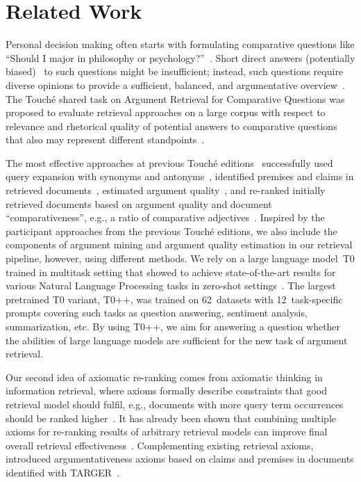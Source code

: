 \section{Related Work}

Personal decision making often starts with formulating comparative questions like ``Should I major in philosophy or psychology?''~\cite{BondarenkoFBGAPBSWPH2020,BondarenkoGFBAPBSWPH2021,BondarenkoFKSGBPBSWPH2022}. Short direct answers (potentially biased)~\cite{PotthastHS2020} to such questions might be insufficient; instead, such questions require diverse opinions to provide a sufficient, balanced, and argumentative overview~\cite{BondarenkoFBGAPBSWPH2020}.
The Touch{\'e} shared task on Argument Retrieval for Comparative Questions was proposed to evaluate retrieval approaches on a large corpus with respect to relevance and rhetorical quality of potential answers to comparative questions that also may represent different standpoints~\cite{BondarenkoFKSGBPBSWPH2022,BondarenkoADHBH2022}.

The most effective approaches at previous Touch{\'e} editions~\cite{BondarenkoFBGAPBSWPH2020,BondarenkoGFBAPBSWPH2021} successfully used query expansion with synonyms and antonyms~\cite{AbyeST2020}, identified premises and claims in retrieved documents~\cite{Huck2020, ShirshakovaW2021}, estimated argument quality~\cite{AbyeST2020}, and re-ranked initially retrieved documents based on argument quality and document ``comparativeness'', e.g., a ratio of comparative adjectives~\cite{ChekalinaP2021}. Inspired by the participant approaches from the previous Touch{\'e} editions, we also include the components of argument mining and argument quality estimation in our retrieval pipeline, however, using different methods.
We rely on a large language model~T0 trained in multitask setting that showed to achieve state-of-the-art results for various Natural Language Processing tasks in zero-shot settings~\cite{SanhWRBSACSLRDBXTSSKCNDCJWMSYPBWNRSSFFTBGBWR2021}. The largest pretrained T0 variant, T0++, was trained on 62~datasets with 12~task-specific prompts covering such tasks as question answering, sentiment analysis, summarization, etc. By using T0++, we aim for answering a question whether the abilities of large language models are sufficient for the new task of argument retrieval.

Our second idea of axiomatic re-ranking comes from axiomatic thinking in information retrieval, where axioms formally describe constraints that good retrieval model should fulfil, e.g., documents with more query term occurrences should be ranked higher~\citet{FangTZ2004}. It has already been shown that combining multiple axioms for re-ranking results of arbitrary retrieval models can improve final overall retrieval effectiveness~\cite{HagenVGS2016}. Complementing existing retrieval axioms, \citet{BondarenkoHVSPB2018} introduced argumentativeness axioms based on claims and premises in documents identified with TARGER~\cite{ChernodubOHBHBP2019}.
